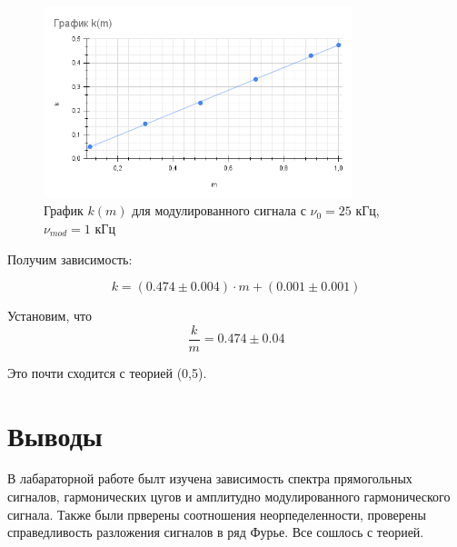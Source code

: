 \documentclass[11pt]{article}
\begin{document}
\begin{figure}[H]
    \centering
    \includegraphics[width=0.8\textwidth]{graf3.png}
    \caption{График \( k(m) \) для модулированного сигнала с \(\nu_0 = 25\) кГц, \(\nu_{mod} = 1\) кГц}
    \label{pic_dnu_tau}
\end{figure}

Получим зависимость:

\[ k = (0.474 \pm 0.004)\cdot m + (0.001 \pm 0.001) \]


Установим, что 
\[ \frac{k}{m} = 0.474 \pm 0.04 \]

Это почти сходится с теорией (0,5).

\section{Выводы}

В лабараторной работе былт изучена зависимость спектра прямогольных сигналов, гармонических цугов и амплитудно модулированного гармонического сигнала. Также были прверены соотношения неорпеделенности, проверены справедливость разложения сигналов в ряд Фурье. Все сошлось с теорией.
\end{document}
